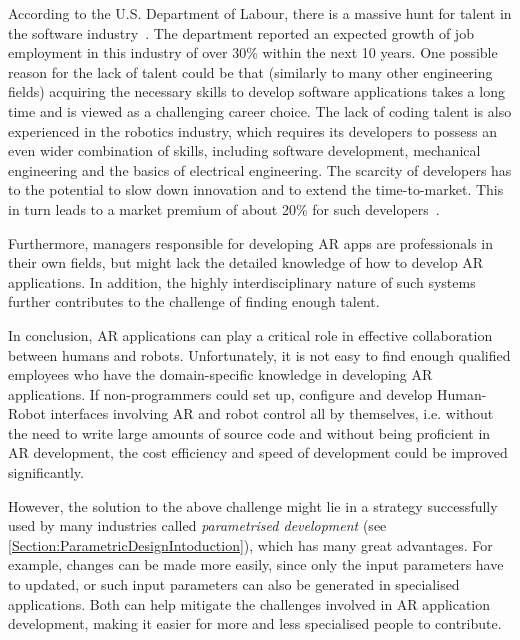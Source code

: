 According to the U.S. Department of Labour, there is a massive hunt for talent in the software industry~\cite{blsGov}. The department reported an expected growth of job employment in this industry of over 30\% within the next 10 years. One possible reason for the lack of talent could be that (similarly to many other engineering fields) acquiring the necessary skills to develop software applications takes a long time and is viewed as a challenging career choice. The lack of coding talent is also experienced in the robotics industry, which requires its developers to possess an even wider combination of skills, including software development, mechanical engineering and the basics of electrical engineering. The scarcity of developers has to the potential to slow down innovation and to extend the time-to-market. This in turn leads to a market premium of about 20\% for such developers~\cite{devShortageHackernoon}.

Furthermore, managers responsible for developing AR apps are professionals in their own fields, but might lack the detailed knowledge of how to develop AR applications. In addition, the highly interdisciplinary nature of such systems further contributes to the challenge of finding enough talent. 


\label{Section:PARRHIApproach}

In conclusion, AR applications can play a critical role in effective collaboration between humans and robots. Unfortunately, it is not easy to find enough qualified employees who have the domain-specific knowledge in developing AR applications. If non-programmers could set up, configure and develop Human-Robot interfaces involving AR and robot control all by themselves, i.e. without the need to write large amounts of source code and without being proficient in AR development, the cost efficiency and speed of development could be improved significantly.

However, the solution to the above challenge might lie in a strategy successfully used by many industries called \textit{parametrised development} (see \ref{Section:ParametricDesignIntoduction}), which has many great advantages. For example, changes can be made more easily, since only the input parameters have to updated, or such input parameters can also be  generated in specialised applications. Both can help mitigate the challenges involved in AR application development, making it easier for more and less specialised people to contribute.

